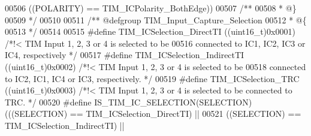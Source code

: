 \begin{DoxyCode}
00506                                       \textcolor{preprocessor}{(}\textcolor{preprocessor}{(}\textcolor{preprocessor}{POLARITY}\textcolor{preprocessor}{)} \textcolor{preprocessor}{==} 
      TIM_ICPolarity_BothEdge\textcolor{preprocessor}{)}\textcolor{preprocessor}{)}
00507 \textcolor{comment}{/**}
00508 \textcolor{comment}{  * @\}}
00509 \textcolor{comment}{  */}
00510 
00511 \textcolor{comment}{/** @defgroup TIM\_Input\_Capture\_Selection }
00512 \textcolor{comment}{  * @\{}
00513 \textcolor{comment}{  */}
00514 
00515 \textcolor{preprocessor}{#}\textcolor{preprocessor}{define} \textcolor{preprocessor}{TIM\_ICSelection\_DirectTI}           \textcolor{preprocessor}{(}\textcolor{preprocessor}{(}\textcolor{preprocessor}{uint16\_t}\textcolor{preprocessor}{)}0x0001\textcolor{preprocessor}{)} \textcolor{comment}{/*!< TIM Input 1, 2, 3 or 4 is selected
       to be }
00516 \textcolor{comment}{                                                                   connected to IC1, IC2, IC3 or IC4,
       respectively */}
00517 \textcolor{preprocessor}{#}\textcolor{preprocessor}{define} \textcolor{preprocessor}{TIM\_ICSelection\_IndirectTI}         \textcolor{preprocessor}{(}\textcolor{preprocessor}{(}\textcolor{preprocessor}{uint16\_t}\textcolor{preprocessor}{)}0x0002\textcolor{preprocessor}{)} \textcolor{comment}{/*!< TIM Input 1, 2, 3 or 4 is selected
       to be}
00518 \textcolor{comment}{                                                                   connected to IC2, IC1, IC4 or IC3,
       respectively. */}
00519 \textcolor{preprocessor}{#}\textcolor{preprocessor}{define} \textcolor{preprocessor}{TIM\_ICSelection\_TRC}                \textcolor{preprocessor}{(}\textcolor{preprocessor}{(}\textcolor{preprocessor}{uint16\_t}\textcolor{preprocessor}{)}0x0003\textcolor{preprocessor}{)} \textcolor{comment}{/*!< TIM Input 1, 2, 3 or 4 is selected
       to be connected to TRC. */}
00520 \textcolor{preprocessor}{#}\textcolor{preprocessor}{define} \textcolor{preprocessor}{IS\_TIM\_IC\_SELECTION}\textcolor{preprocessor}{(}\textcolor{preprocessor}{SELECTION}\textcolor{preprocessor}{)} \textcolor{preprocessor}{(}\textcolor{preprocessor}{(}\textcolor{preprocessor}{(}\textcolor{preprocessor}{SELECTION}\textcolor{preprocessor}{)} \textcolor{preprocessor}{==} 
      TIM_ICSelection_DirectTI\textcolor{preprocessor}{)} \textcolor{preprocessor}{||}
00521                                         \textcolor{preprocessor}{(}\textcolor{preprocessor}{(}\textcolor{preprocessor}{SELECTION}\textcolor{preprocessor}{)} \textcolor{preprocessor}{==} 
      TIM_ICSelection_IndirectTI\textcolor{preprocessor}{)} \textcolor{preprocessor}{||}

\end{DoxyCode}
